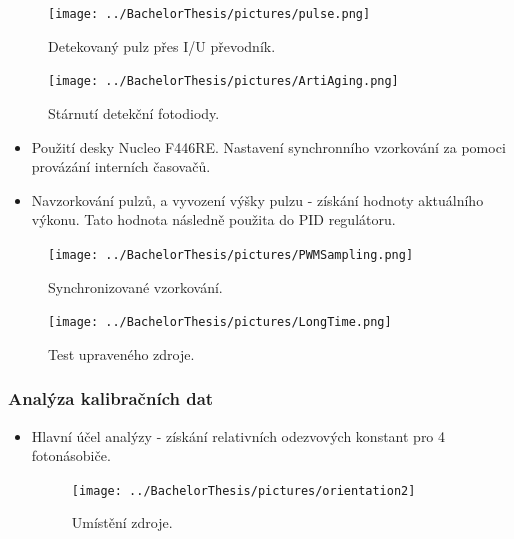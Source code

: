 \documentclass{beamer}
\begin{document}
\begin{frame}

 \begin{figure}[H]
 \centering
 \texttt{[image: ../BachelorThesis/pictures/pulse.png]}
 \caption{Detekovaný pulz přes I/U převodník.}
 \label{UVsource}
\end{figure}


\end{frame}






\begin{frame}

 \begin{figure}[H]
 \centering
 \texttt{[image: ../BachelorThesis/pictures/ArtiAging.png]}
 \caption{Stárnutí detekční fotodiody.}
 \label{UVsource}
\end{figure}


\end{frame}



\begin{frame}

\begin{itemize}
 \item 
 Použití desky Nucleo F446RE. Nastavení synchronního vzorkování za pomoci provázání interních časovačů.
 \item 
 Navzorkování pulzů, a vyvození výšky pulzu - získání hodnoty aktuálního výkonu. Tato hodnota následně použita do PID regulátoru. 
 
 \end{itemize}
 \begin{figure}[H]
 \centering
 \texttt{[image: ../BachelorThesis/pictures/PWMSampling.png]}
 \caption{Synchronizované vzorkování.}
 \label{UVsource}
\end{figure}


\end{frame}


\begin{frame}

 \begin{figure}[H]
 \centering
 \texttt{[image: ../BachelorThesis/pictures/LongTime.png]}
 \caption{Test upraveného zdroje.}
 \label{UVsource}
\end{figure}


\end{frame}



\begin{frame}
\frametitle{Analýza kalibračních dat}
\begin{itemize}

 \item Hlavní účel analýzy - získání relativních odezvových konstant pro 4 fotonásobiče.

 \begin{figure}[H]
 \texttt{[image: ../BachelorThesis/pictures/orientation2]}\\
\caption{Umístění zdroje.}
 \end{figure}
 
 \end{itemize}
 \end{frame}  
 
\end{document}
